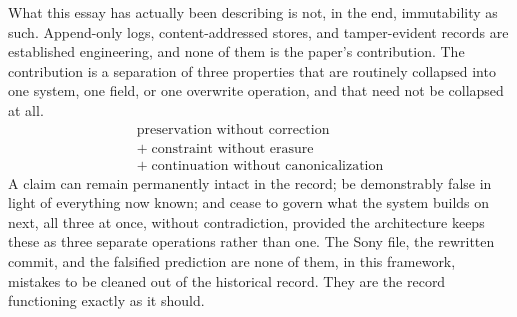 \documentclass[11pt]{article}
\begin{document}
What this essay has actually been describing is not, in the end, immutability as such. Append-only logs, content-addressed stores, and tamper-evident records are established engineering, and none of them is the paper's contribution. The contribution is a separation of three properties that are routinely collapsed into one system, one field, or one overwrite operation, and that need not be collapsed at all.
\[
\boxed{
\begin{array}{c}
\text{preservation without correction} \\
+\;\text{constraint without erasure} \\
+\;\text{continuation without canonicalization}
\end{array}}
\]
A claim can remain permanently intact in the record; be demonstrably false in light of everything now known; and cease to govern what the system builds on next, all three at once, without contradiction, provided the architecture keeps these as three separate operations rather than one. The Sony file, the rewritten commit, and the falsified prediction are none of them, in this framework, mistakes to be cleaned out of the historical record. They are the record functioning exactly as it should.
\end{document}
